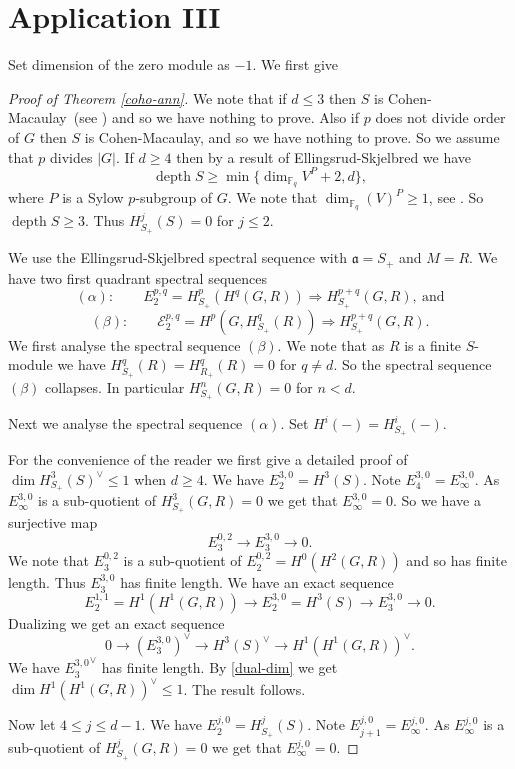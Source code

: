 \documentclass{amsart}
\newcommand{\CM}{Cohen-Macaulay}
\newcommand{\F}{\mathbb{F} }
\newcommand{\A}{\mathfrak{a} }
\newcommand{\rt}{\rightarrow}
\newcommand{\depth}{\operatorname{depth}}
\theoremstyle{plain}
\theoremstyle{definition}
\theoremstyle{remark}
\begin{document}
\section{Application III}
Set dimension of the zero module as $-1$.
We first give
\begin{proof}[Proof of Theorem \ref{coho-ann}]
We note that if $d \leq 3$ then $S$ is \CM \ (see \cite{S-3}) and so we have nothing to prove. Also if $p$ does not divide order of $G$ then $S$ is \CM, and so we have nothing to prove. So we assume that $p$ divides $|G|$.  If $d \geq 4$ then by a result of Ellingsrud-Skjelbred \cite[3.9]{ES} we have
\[
\depth S \geq \min\{ \dim_{\F_q}V^P + 2, d \},
\]
where $P$ is a Sylow $p$-subgroup of $G$. We note that $\dim_{\F_q} (V)^P \geq 1$, see \cite[8.2.1]{SL}. So $\depth S \geq 3$. Thus $H^j_{S_+}(S) = 0$ for $j \leq 2$.

We use the Ellingsrud-Skjelbred  spectral sequence with $\A = S_+$ and $M = R$. We have two first quadrant spectral sequences
\[
(\alpha)\colon \quad \quad  E_2^{p,q} = H^p_{S_+}(H^q(G, R)) \Longrightarrow H^{p+q}_{S_+}(G,R), \ \text{and}
\]
\[
(\beta)\colon \quad \quad \mathcal{E}_2^{p,q} = H^p(G, H^q_{S_+}(R)) \Longrightarrow H^{p+q}_{S_+}(G,R).
\]
We first analyse the spectral sequence $(\beta)$. We note that as $R$ is a finite $S$-module we have $H^q_{S_+}(R) = H^q_{R_+}(R) = 0$ for $q \neq d$. So the spectral sequence $(\beta)$ collapses. In particular $H^n_{S_+}(G, R) = 0$ for $n < d$.

Next we analyse the spectral sequence $(\alpha)$. Set $H^i(-) = H^i_{S_+}(-)$.

For the convenience of the reader we first give a detailed proof of $\dim H^3_{S_+}(S)^\vee \leq 1$ when $d \geq 4$.
We have $E_2^{3,0} = H^3(S)$.
Note $E^{3,0}_4 = E^{3,0}_\infty$. As $E^{3,0}_\infty$ is a sub-quotient  of $H^3_{S_+}(G, R) = 0$ we get that $E^{3,0}_\infty = 0$.
So we have a surjective map
$$ E_3^{0,2} \rt E_3^{3,0}  \rt 0.$$
We note that $ E_3^{0,2}$ is a sub-quotient of $ E_2^{0,2} = H^0(H^2(G, R))$ and so has finite length. Thus $E_3^{3,0}$ has finite length.
We have an exact    sequence
$$E_2^{1, 1} = H^1(H^1(G,R)) \rt E_2^{3,0} = H^3(S)  \rt E_3^{3,0} \rt 0. $$
Dualizing we get an exact sequence
$$ 0 \rt (E_3^{3,0})^\vee \rt H^3(S)^\vee \rt H^1(H^1(G, R))^\vee.$$
We have ${E_3^{3,0}}^\vee$ has finite length. By \ref{dual-dim} we get  $ \dim H^1(H^1(G, R))^\vee \leq 1$. The result follows.

Now let $4 \leq j \leq d -1$.  We have $E^{j,0}_2 = H^j_{S_+}(S)$.
Note $E^{j,0}_{j+1} = E^{j,0}_\infty$. As $E^{j,0}_\infty$ is a sub-quotient  of $H^j_{S_+}(G, R) = 0$ we get that $E^{j,0}_\infty = 0$.


\end{proof}
\end{document}
